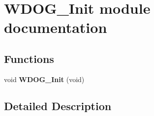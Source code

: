 \hypertarget{group___w_d_o_g___init__module}{}\section{W\+D\+O\+G\+\_\+\+Init module documentation}
\label{group___w_d_o_g___init__module}
\subsection*{Functions}
\begin{DoxyCompactItemize}
\item 
void {\bfseries W\+D\+O\+G\+\_\+\+Init} (void)\hypertarget{group___w_d_o_g___init__module_gadcb51d928dd61ccac24da97a0671ded6}{}\label{group___w_d_o_g___init__module_gadcb51d928dd61ccac24da97a0671ded6}

\end{DoxyCompactItemize}


\subsection{Detailed Description}
